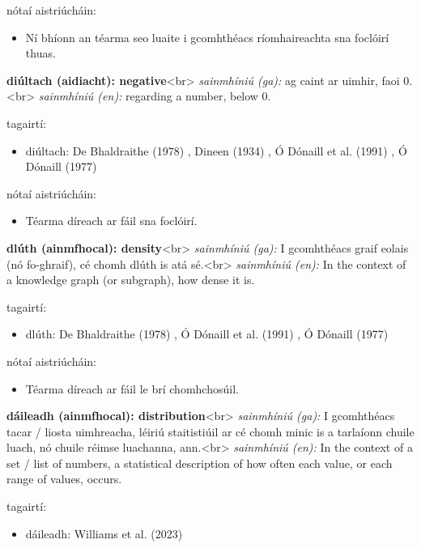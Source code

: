 \documentclass{article}
\begin{document}
nótaí aistriúcháin:
\begin{itemize}
	\item Ní bhíonn an téarma seo luaite i gcomhthéacs ríomhaireachta sna foclóirí thuas.
\end{itemize}


\textbf{diúltach (aidiacht): negative}<br>
\textit{sainmhíniú (ga):} ag caint ar uimhir, faoi 0.<br>
\textit{sainmhíniú (en):} regarding a number, below 0.

tagairtí:
\begin{itemize}
	\item diúltach: De Bhaldraithe (1978) \cite{de-bhaldraithe}, Dineen (1934) \cite{dineen}, Ó Dónaill et al. (1991) \cite{focloir-beag}, Ó Dónaill (1977) \cite{odonaill}
\end{itemize}

nótaí aistriúcháin:
\begin{itemize}
	\item Téarma díreach ar fáil sna foclóirí.
\end{itemize}


\textbf{dlúth (ainmfhocal): density}<br>
\textit{sainmhíniú (ga):} I gcomhthéacs graif eolais (nó fo-ghraif), cé chomh dlúth is atá sé.<br>
\textit{sainmhíniú (en):} In the context of a knowledge graph (or subgraph), how dense it is.

tagairtí:
\begin{itemize}
	\item dlúth: De Bhaldraithe (1978) \cite{de-bhaldraithe}, Ó Dónaill et al. (1991) \cite{focloir-beag}, Ó Dónaill (1977) \cite{odonaill}
\end{itemize}

nótaí aistriúcháin:
\begin{itemize}
	\item Téarma díreach ar fáil le brí chomhchosúil.
\end{itemize}


\textbf{dáileadh (ainmfhocal): distribution}<br>
\textit{sainmhíniú (ga):} I gcomhthéacs tacar / liosta uimhreacha, léiriú staitistiúil ar cé chomh minic is a tarlaíonn chuile luach, nó chuile réimse luachanna, ann.<br>
\textit{sainmhíniú (en):} In the context of a set / list of numbers, a statistical description of how often each value, or each range of values, occurs.

tagairtí:
\begin{itemize}
	\item dáileadh: Williams et al. (2023) \cite{storchiste}
\end{itemize}
\end{document}
